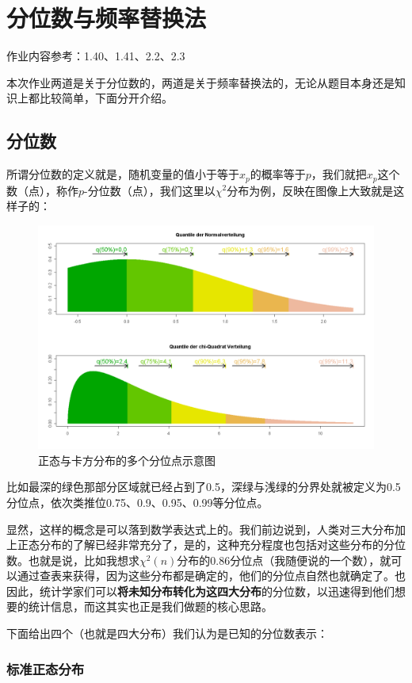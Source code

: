 \documentclass[10pt, a4paper]{article}
\begin{document}
\section{分位数与频率替换法}
作业内容参考：1.40、1.41、2.2、2.3\par
本次作业两道是关于分位数的，两道是关于频率替换法的，无论从题目本身还是知识上都比较简单，下面分开介绍。
\subsection{分位数}
所谓分位数的定义就是，随机变量的值小于等于$x_p$的概率等于$p$，我们就把$x_p$这个数（点），称作$p$-分位数（点），我们这里以$\chi^2$分布为例，反映在图像上大致就是这样子的：

\begin{figure}[H]
    \centering
    \includegraphics[width=0.8\linewidth]{quantile.png}
    \caption{正态与卡方分布的多个分位点示意图}
    \label{fig:quantile}
\end{figure}
比如最深的绿色那部分区域就已经占到了0.5，深绿与浅绿的分界处就被定义为0.5分位点，依次类推位0.75、0.9、0.95、0.99等分位点。\par
显然，这样的概念是可以落到数学表达式上的。我们前边说到，人类对三大分布加上正态分布的了解已经非常充分了，是的，这种充分程度也包括对这些分布的分位数。也就是说，比如我想求$\chi^2(n)$分布的0.86分位点（我随便说的一个数），就可以通过查表来获得，因为这些分布都是确定的，他们的分位点自然也就确定了。也因此，统计学家们可以\textbf{将未知分布转化为这四大分布}的分位数，以迅速得到他们想要的统计信息，而这其实也正是我们做题的核心思路。\par
下面给出四个（也就是四大分布）我们认为是已知的分位数表示：
\subsubsection*{标准正态分布}
\end{document}
